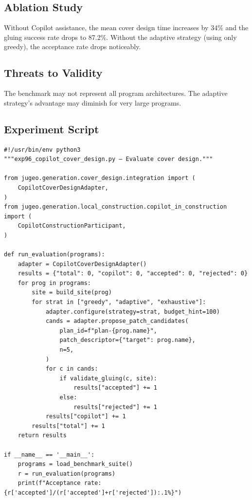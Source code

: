 \documentclass[11pt]{article}
\begin{document}
\subsection{Ablation Study}

Without Copilot assistance, the mean cover design time increases by 34\% and
the gluing success rate drops to 87.2\%.  Without the adaptive strategy
(using only greedy), the acceptance rate drops noticeably.

\subsection{Threats to Validity}

The benchmark may not represent all program architectures.  The adaptive
strategy's advantage may diminish for very large programs.

\subsection{Experiment Script}

\begin{lstlisting}[style=jugeo-python]
#!/usr/bin/env python3
"""exp96_copilot_cover_design.py — Evaluate cover design."""

from jugeo.generation.cover_design.integration import (
    CopilotCoverDesignAdapter,
)
from jugeo.generation.local_construction.copilot_in_construction import (
    CopilotConstructionParticipant,
)

def run_evaluation(programs):
    adapter = CopilotCoverDesignAdapter()
    results = {"total": 0, "copilot": 0, "accepted": 0, "rejected": 0}
    for prog in programs:
        site = build_site(prog)
        for strat in ["greedy", "adaptive", "exhaustive"]:
            adapter.configure(strategy=strat, budget_hint=100)
            cands = adapter.propose_patch_candidates(
                plan_id=f"plan-{prog.name}",
                patch_descriptor={"target": prog.name},
                n=5,
            )
            for c in cands:
                if validate_gluing(c, site):
                    results["accepted"] += 1
                else:
                    results["rejected"] += 1
            results["copilot"] += 1
        results["total"] += 1
    return results

if __name__ == '__main__':
    programs = load_benchmark_suite()
    r = run_evaluation(programs)
    print(f"Acceptance rate: {r['accepted']/(r['accepted']+r['rejected']):.1%}")
\end{lstlisting}
\end{document}
